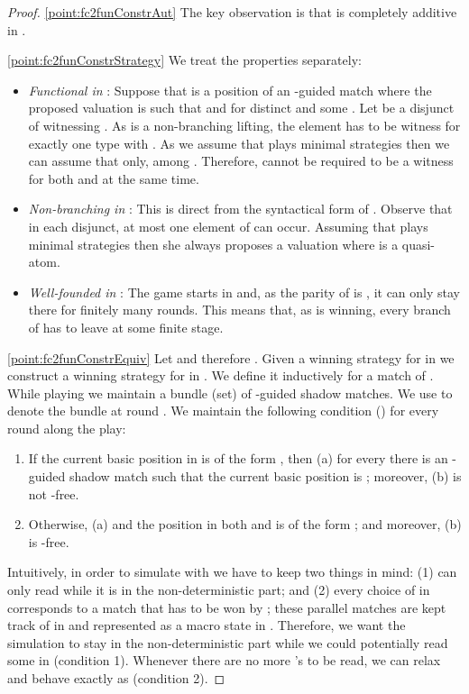 \begin{proof}
\eqref{point:fc2funConstrAut} The key observation is that  is completely additive in .

\noindent
\eqref{point:fc2funConstrStrategy} We treat the properties separately:
\begin{itemize}
	 pt
\item \textit{Functional in }: Suppose that  is a position of an -guided match where the proposed valuation  is such that  and  for distinct  and some . Let  be a disjunct of  witnessing . As  is a non-branching lifting, the element  has to be witness for exactly one type  with . As we assume that \eloise plays minimal strategies then we can assume that  only, among . Therefore,  cannot be required to be a witness for both  and  at the same time.
\item \textit{Non-branching in }: This is direct from the syntactical form of . Observe that in each disjunct, at most one element of  can occur. Assuming that  plays minimal strategies then she always proposes a valuation  where  is a quasi-atom.
\item \textit{Well-founded in }: The game starts in  and, as the parity of  is , it can only stay there for finitely many rounds. This means that, as  is winning, every branch of  has to leave  at some finite stage. 
\end{itemize}

\noindent
\eqref{point:fc2funConstrEquiv}
\fbox{}
Let  and therefore . Given a winning strategy  for \eloise in  we construct a winning strategy  for \eloise in . We define it inductively for a match  of . While playing  we maintain a bundle (set)  of -guided shadow matches. We use  to denote the bundle at round . We maintain the following condition () for every round along the play:
\begin{enumerate}[1.]
  \item If the current basic position in  is of the form , then (a) for every  there is an -guided shadow match  such that the current basic position is ; moreover, (b)  is not -free.
\item Otherwise, (a)  and the position in both  and  is of the form ; and moreover, (b)  is -free.
\end{enumerate}
Intuitively, in order to simulate  with  we have to keep two things in mind: (1)  can only read  while it is in the non-deterministic part; and (2) every choice of \abelard in  corresponds to a match that has to be won by \eloise; these parallel matches are kept track of in  and represented as a macro state in . Therefore, we want the simulation to stay in the non-deterministic part while we could potentially read some  in  (condition 1). Whenever there are no more 's to be read, we can relax and behave exactly as  (condition 2).


\end{proof}
